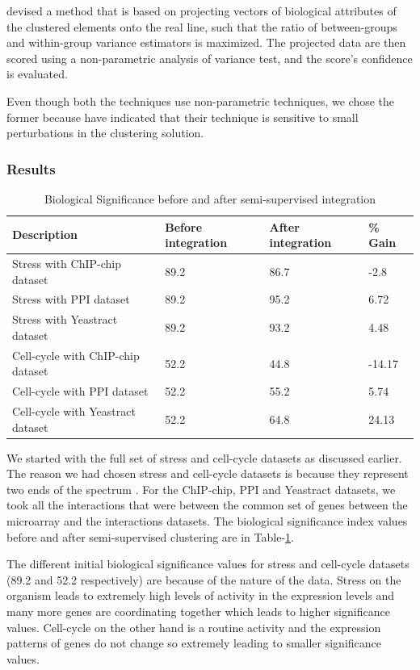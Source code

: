 \citet{gatviks03scoring} devised a method that is based on projecting vectors of biological attributes of the clustered elements onto the real line, such that the ratio 
of between-groups and within-group variance estimators is maximized. The projected data are then scored using a non-parametric analysis of variance test, and the 
score's conﬁdence is evaluated.

Even though both the techniques use non-parametric techniques, we chose the former because \citet{gatviks03scoring} have indicated that their technique is sensitive to small perturbations in 
the clustering solution.  


\subsubsection{Results}
\begin{table}
\centering
\begin{tabular}{|l|l|l|l|}
\hline
Description & Before integration & After integration & \% Gain\\
\hline
Stress with ChIP-chip dataset & 89.2 & 86.7 & -2.8\\
Stress with PPI dataset & 89.2 & 95.2 & 6.72\\
Stress with Yeastract dataset & 89.2 & 93.2 & 4.48\\
\hline
Cell-cycle with ChIP-chip dataset & 52.2 & 44.8 & -14.17\\
Cell-cycle with PPI dataset & 52.2 & 55.2 & 5.74\\
Cell-cycle with Yeastract dataset & 52.2 & 64.8 & 24.13\\
\hline 
\end{tabular}
\caption{Biological Significance before and after semi-supervised integration}
\label{tab:biol_significance}
\end{table}

We started with the full set of stress and cell-cycle datasets as discussed earlier. The reason we had chosen stress and cell-cycle datasets is because they represent two ends of the spectrum \citep{amos05integrative}. 
For the ChIP-chip, PPI and Yeastract datasets, we took all the interactions that were between the common set of genes between the microarray and the interactions datasets. 
The biological significance index values before and after semi-supervised clustering are in Table-\ref{tab:biol_significance}. 

The different initial biological significance values for stress and cell-cycle datasets (89.2 and 52.2 respectively) are because of the nature of the data. Stress on the organism 
leads to extremely high levels of activity 
in the expression levels and many more genes are coordinating together which leads to higher significance values. Cell-cycle on the other hand is a routine activity and the 
expression patterns of genes do not change so extremely leading to smaller significance values.

